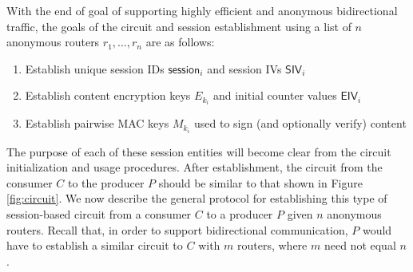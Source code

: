 \documentclass[10pt]{article}
\begin{document}
With the end of goal of supporting highly efficient and anonymous bidirectional traffic, the goals of the circuit and session establishment using a list of $n$ anonymous routers $r_1,\dots,r_n$ are as follows:
\begin{enumerate}
\item Establish unique session IDs $\mathsf{session}_{i}$ and session IVs $\mathsf{SIV}_i$
\item Establish content encryption keys $E_{k_i}$ and initial counter values $\mathsf{EIV}_i$
\item Establish pairwise MAC keys $M_{k_i}$ used to sign (and optionally verify) content
\end{enumerate}
The purpose of each of these session entities will become clear from the circuit initialization and usage procedures. After establishment, the circuit from the consumer $C$ to the producer $P$ should be similar to that shown in Figure \ref{fig:circuit}. We now describe the general protocol for establishing this type of session-based circuit from a consumer $C$ to a producer $P$ given $n$ anonymous routers. Recall that, in order to support bidirectional communication, $P$ would have to establish a similar circuit to $C$ with $m$ routers, where $m$ need not equal $n$. 
\end{document}
